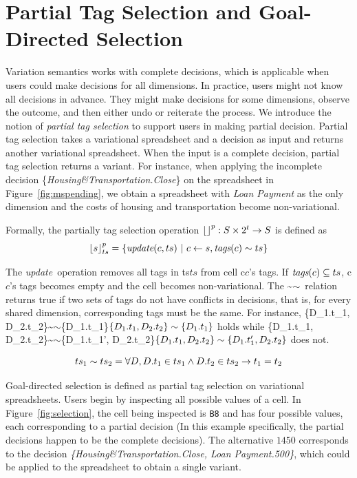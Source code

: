 \documentclass[conference]{IEEEtran}
\def\OB#1{\ifmmode#1\else\mbox{$#1$}\fi}
\newcommand{\prog}[1]{{\small\texttt{#1}}}
\newcommand{\tg}{\OB{t}}
\newcommand{\vsheet}{\OB{s}}
\newcommand{\VSheet}{\OB{S}}
\newcommand{\mapname}[1]{\textit{#1}}
\newcommand{\dset}[1]{\{#1\}}
\newcommand{\htdim}{Housing\&Transportation}
\newcommand{\lpdim}{Loan Payment}
\begin{document}
\section{Partial Tag Selection and Goal-Directed Selection}
\newcommand{\ptsel}[2][s]{\OB{{\lfloor#2\rfloor}^p_{#1}}}
\newcommand{\compatibleSym}{\OB{\sim}}
\newcommand{\compatible}[2]{\OB{#1\compatibleSym#2}}
\newcommand{\updateText}{\textit{update}}
\newcommand{\update}[2]{\updateText(#1, #2)}

Variation semantics works with complete decisions, which is applicable
when users could make decisions for all dimensions. In practice, 
users might not know all decisions in advance. They might make decisions
for some dimensions, observe the outcome, and then either undo or reiterate the process.
We introduce the notion of \emph{partial tag selection} to support users
in making partial decision. Partial tag selection takes a variational
spreadsheet and a decision as input and returns another variational spreadsheet. 
When the input is a complete decision, partial tag selection returns a variant.
For instance, when applying the incomplete decision \dset{\mapname{\htdim.Close}}
on the spreadsheet in Figure~\ref{fig:mspending}, we obtain a spreadsheet
with \mapname{\lpdim} as the only dimension and the costs of housing and transportation become non-variational.  
 
Formally, the partially tag selection operation $\ptsel[]{} : \VSheet \times 2^{\tg} \rightarrow \VSheet$ is defined as
\[
\ptsel[ts]{\vsheet} = \{\update{c}{ts}\ |\ c \leftarrow \vsheet, \compatible{\tagsCell{c}}{ts} \}
\]

\noindent
The \updateText~operation removes all tags in \OB{ts} from cell \OB{c}'s tags.
If $\tagsCell{c} \subseteq ts$, \OB{c}'s tags becomes empty and the cell becomes
non-variational. The \compatibleSym~relation returns true if two sets of tags do not have
conflicts in decisions, that is, for every shared dimension,
corresponding tags must be the same. 
For instance, \compatible{\dset{D_1.t_1, D_2.t_2}}{\dset{D_1.t_1}} holds while \compatible{\dset{D_1.t_1, D_2.t_2}}{\dset{D_1.{t_1'}, D_2.t_2}} does not.

\[
\compatible{ts_1}{ts_2} = \forall D, D.{t_1} \in ts_1 \wedge D.{t_2} \in ts_2 \rightarrow t_1 = t_2
\]

Goal-directed selection is defined as partial tag selection on variational spreadsheets. Users
begin by inspecting all possible values of a cell. In Figure~\ref{fig:selection},
the cell being inspected is \prog{B8} and has four possible values, each
corresponding to a partial decision (In this example specifically, the partial decisions happen to be the complete decisions). The alternative \OB{1450} corresponds
to the decision \mapname{\{\htdim.Close, \lpdim.500\}}, which could be applied to
 the spreadsheet to obtain a single variant.
\end{document}
